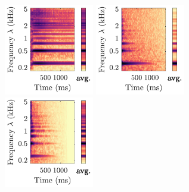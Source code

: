 \documentclass{bmcart}
\begin{document}
\begin{backmatter}
\begin{figure}
\hspace{18mm}
\hspace{24mm}
\hspace{8mm}
\vspace{1cm}


\includegraphics[height=4cm]{figures/violin_scattering/Vn-sfz-C4-fp-4c_scalogram.pdf}
\hspace{8mm}
\includegraphics[trim=35 0 0 0, clip, height=4cm]{figures/violin_scattering/Vn-pizz-lv-C4-pp-4c_scalogram.pdf}
\hspace{12mm}
\includegraphics[trim=35 0 0 0, clip, height=4cm]{figures/violin_scattering/Vn-stacc-C4-mf_scalogram.pdf}



\end{figure}
\end{backmatter}
\end{document}
